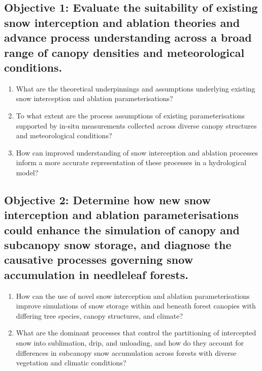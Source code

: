 \documentclass[
  letterpaper,
]{tex/uofsthesis-cs}
\begin{document}
\subsection{Objective 1: Evaluate the suitability of existing snow
interception and ablation theories and advance process understanding
across a broad range of canopy densities and meteorological
conditions.}\label{objective-1-evaluate-the-suitability-of-existing-snow-interception-and-ablation-theories-and-advance-process-understanding-across-a-broad-range-of-canopy-densities-and-meteorological-conditions.}

\begin{enumerate}
\def\labelenumi{\arabic{enumi}.}
\item
  What are the theoretical underpinnings and assumptions underlying
  existing snow interception and ablation parameterisations?
\item
  To what extent are the process assumptions of existing
  parameterisations supported by in-situ measurements collected across
  diverse canopy structures and meteorological conditions?
\item
  How can improved understanding of snow interception and ablation
  processes inform a more accurate representation of these processes in
  a hydrological model?
\end{enumerate}

\subsection{Objective 2: Determine how new snow interception and
ablation parameterisations could enhance the simulation of canopy and
subcanopy snow storage, and diagnose the causative processes governing
snow accumulation in needleleaf
forests.}\label{objective-2-determine-how-new-snow-interception-and-ablation-parameterisations-could-enhance-the-simulation-of-canopy-and-subcanopy-snow-storage-and-diagnose-the-causative-processes-governing-snow-accumulation-in-needleleaf-forests.}

\begin{enumerate}
\def\labelenumi{\arabic{enumi}.}
\setcounter{enumi}{3}
\item
  How can the use of novel snow interception and ablation
  parameterisations improve simulations of snow storage within and
  beneath forest canopies with differing tree species, canopy
  structures, and climate?
\item
  What are the dominant processes that control the partitioning of
  intercepted snow into sublimation, drip, and unloading, and how do
  they account for differences in subcanopy snow accumulation across
  forests with diverse vegetation and climatic conditions?
\end{enumerate}
\end{document}
